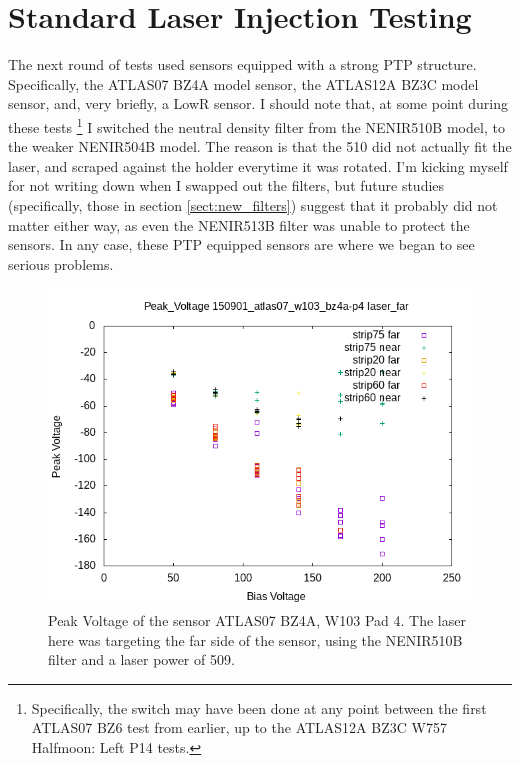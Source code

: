 \documentclass{report}
\begin{document}
        \section{Standard Laser Injection Testing} \label{sect:std_tests}
            The next round of tests used sensors equipped with a strong PTP structure. Specifically, the ATLAS07 BZ4A model sensor, the ATLAS12A BZ3C model sensor, and, very briefly, a LowR sensor. I should note that, at some point during these tests \footnote{Specifically, the switch may have been done at any point between the first ATLAS07 BZ6 test from earlier, up to the ATLAS12A BZ3C W757 Halfmoon: Left P14 tests.} I switched the neutral density filter from the NENIR510B model, to the weaker NENIR504B model. The reason is that the 510 did not actually fit the laser, and scraped against the holder everytime it was rotated. I'm kicking myself for not writing down when I swapped out the filters, but future studies (specifically, those in section \ref{sect:new_filters}) suggest that it probably did not matter either way, as even the NENIR513B filter was unable to protect the sensors. In any case, these PTP equipped sensors are where we began to see serious problems.

            \begin{figure}[h] 
                \includegraphics[height=.4\textheight]{Peak_Voltage__150901_atlas07_w103_bz4a-p4__laser_far}
                \centering
                \caption{ Peak Voltage of the sensor ATLAS07 BZ4A, W103 Pad 4. The laser here was targeting the far side of the sensor, using the NENIR510B filter and a laser power of 509. }
                \label{fig:Peak_Voltage__150901_atlas07_w103_bz4a-p4__laser_far}
            \end{figure}
\end{document}
